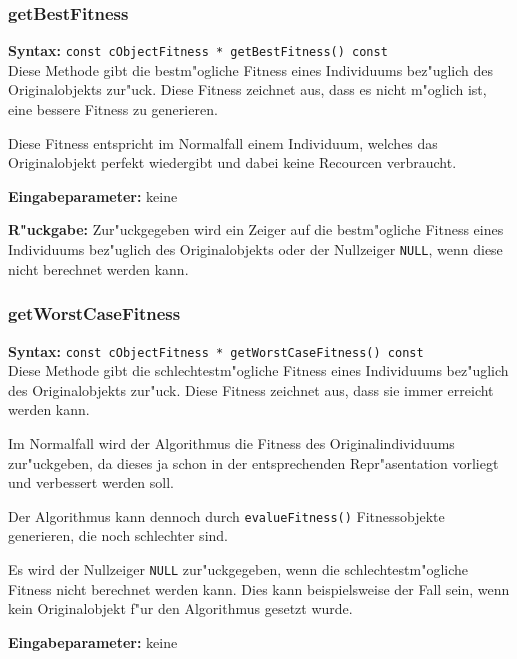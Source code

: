 \subsubsection{getBestFitness}

\textbf{Syntax:} \verb|const cObjectFitness * getBestFitness() const| \\

Diese Methode gibt die bestm"ogliche Fitness eines Individuums bez"uglich des Originalobjekts zur"uck. Diese Fitness zeichnet aus, dass es nicht m"oglich ist, eine bessere Fitness zu generieren.

Diese Fitness entspricht im Normalfall einem Individuum, welches das Originalobjekt perfekt wiedergibt und dabei keine Recourcen verbraucht.

\bigskip\noindent
\textbf{Eingabeparameter:} keine

\bigskip\noindent
\textbf{R"uckgabe:} Zur"uckgegeben wird ein Zeiger auf die bestm"ogliche Fitness eines Individuums bez"uglich des Originalobjekts oder der Nullzeiger \verb|NULL|, wenn diese nicht berechnet werden kann.


\subsubsection{getWorstCaseFitness}

\textbf{Syntax:} \verb|const cObjectFitness * getWorstCaseFitness() const| \\

Diese Methode gibt die schlechtestm"ogliche Fitness eines Individuums bez"uglich des Originalobjekts zur"uck. Diese Fitness zeichnet aus, dass sie immer erreicht werden kann.

Im Normalfall wird der Algorithmus die Fitness des Originalindividuums zur"uckgeben, da dieses ja schon in der entsprechenden Repr"asentation vorliegt und verbessert werden soll.

Der Algorithmus kann dennoch durch \verb|evalueFitness()| Fitnessobjekte generieren, die noch schlechter sind.

Es wird der Nullzeiger \verb|NULL| zur"uckgegeben, wenn die schlechtestm"ogliche Fitness nicht berechnet werden kann. Dies kann beispielsweise der Fall sein, wenn kein Originalobjekt f"ur den Algorithmus gesetzt wurde.

\bigskip\noindent
\textbf{Eingabeparameter:} keine

